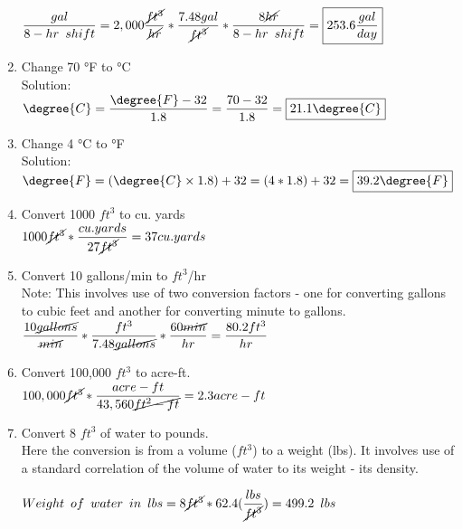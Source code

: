 \documentclass{article}
\begin{document}
\begin{enumerate}
$\dfrac{gal}{8-hr \enspace shift}=2,000\dfrac{\cancel{ft^3}}{\cancel{hr}}*\dfrac{7.48gal}{\cancel{ft^3}}*\dfrac{8\cancel{hr}}{8-hr \enspace shift}=\boxed{253.6 \dfrac{gal}{day}}$

\vspace{0.2cm}
\item Change 70 °F to °C\\
Solution:\\
\vspace{0.2cm}
$\degree{C} = \dfrac{\degree{F}-32}{1.8} = \dfrac{70-32}{1.8}=\boxed{21.1\degree{C}}$
\vspace{0.2cm}
\item Change 4 °C to °F\\
Solution:\\
\vspace{0.2cm}
$\degree{F}=(\degree{C} \times 1.8)+32 = (4*1.8)+32=\boxed{39.2\degree{F}}$
\item Convert 1000 $ft^3$ to cu. yards\\

$1000 \cancel{ft^3}*\dfrac{cu.yards}{27\cancel{ft^3}} = 37 cu.yards$

\item Convert 10 gallons/min to $ft^3$/hr\\
Note:  This involves use of two conversion factors - one for converting gallons to cubic feet and another for converting minute to gallons.\\ 
$\dfrac{10 \cancel{gallons}}{\cancel{min}}*  \dfrac{ft^3}{7.48 \cancel{gallons}}  * \dfrac{60 \cancel{min}}{hr}   = \dfrac{80.2ft^3}{hr}$


\item Convert 100,000 $ft^3$ to acre-ft.\\
$100,000 \cancel{ft^3} * \dfrac{acre-ft}{43,560 \cancel{ft^2-ft}} =  2.3 acre-ft$\\

\item Convert 8 $ft^3$ of water to pounds.\\
Here the conversion is from a volume ($ft^3$) to a weight (lbs).  It involves use of a standard correlation of the volume of water to its weight - its density. 

$Weight \enspace of \enspace water \enspace in \enspace lbs=8 \cancel{ft^3} *   62.4  (\dfrac{lbs}{\cancel{ft^3}}) = 499.2 \enspace lbs $\\
\end{enumerate}
\end{document}
